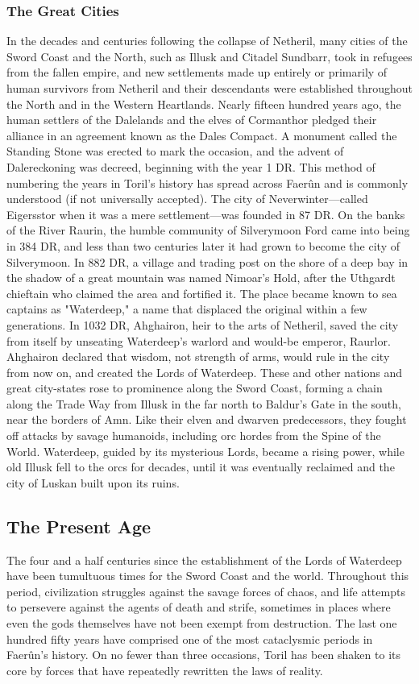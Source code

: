 \documentclass[10pt,a4paper,twoside,twocolumn,openany,bg=print,nodeprecatedcode]{dndbook}
\begin{document}
\subsubsection{The Great Cities}
In the decades and centuries following the collapse of Netheril, many cities of the Sword Coast and the North, such as Illusk and Citadel Sundbarr, took in refugees from the fallen empire, and new settlements made up entirely or primarily of human survivors from Netheril and their descendants were established throughout the North and in the Western Heartlands.
Nearly fifteen hundred years ago, the human settlers of the Dalelands and the elves of Cormanthor pledged their alliance in an agreement known as the Dales Compact. A monument called the Standing Stone was erected to mark the occasion, and the advent of Dalereckoning was decreed, beginning with the year 1 DR. This method of numbering the years in Toril's history has spread across Faerûn and is commonly understood (if not universally accepted).
The city of Neverwinter—called Eigersstor when it was a mere settlement—was founded in 87 DR. On the banks of the River Raurin, the humble community of Silverymoon Ford came into being in 384 DR, and less than two centuries later it had grown to become the city of Silverymoon.
In 882 DR, a village and trading post on the shore of a deep bay in the shadow of a great mountain was named Nimoar's Hold, after the Uthgardt chieftain who claimed the area and fortified it. The place became known to sea captains as "Waterdeep," a name that displaced the original within a few generations. In 1032 DR, Ahghairon, heir to the arts of Netheril, saved the city from itself by unseating Waterdeep's warlord and would-be emperor, Raurlor. Ahghairon declared that wisdom, not strength of arms, would rule in the city from now on, and created the Lords of Waterdeep.
These and other nations and great city-states rose to prominence along the Sword Coast, forming a chain along the Trade Way from Illusk in the far north to Baldur's Gate in the south, near the borders of Amn. Like their elven and dwarven predecessors, they fought off attacks by savage humanoids, including orc hordes from the Spine of the World. Waterdeep, guided by its mysterious Lords, became a rising power, while old Illusk fell to the orcs for decades, until it was eventually reclaimed and the city of Luskan built upon its ruins.
\subsection{The Present Age}
The four and a half centuries since the establishment of the Lords of Waterdeep have been tumultuous times for the Sword Coast and the world. Throughout this period, civilization struggles against the savage forces of chaos, and life attempts to persevere against the agents of death and strife, sometimes in places where even the gods themselves have not been exempt from destruction.
The last one hundred fifty years have comprised one of the most cataclysmic periods in Faerûn's history. On no fewer than three occasions, Toril has been shaken to its core by forces that have repeatedly rewritten the laws of reality.
\end{document}
